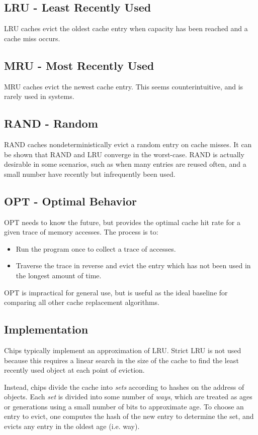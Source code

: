 \documentclass[twoside]{article}
\begin{document}
\subsection{LRU - Least Recently Used}
LRU caches evict the oldest cache entry when capacity has been reached and a
cache miss occurs.

\subsection{MRU - Most Recently Used}
MRU caches evict the newest cache entry. This seems counterintuitive, and is
rarely used in systems.

\subsection{RAND - Random}
RAND caches nondeterministically evict a random entry on cache misses. It can be
shown that RAND and LRU converge in the worst-case. RAND is actually desirable
in some scenarios, such as when many entries are reused often, and a small
number have recently but infrequently been used.

\subsection{OPT - Optimal Behavior}
OPT needs to know the future, but provides the optimal cache hit rate for a
given trace of memory accesses. The process is to:
\begin{itemize}
    \item Run the program once to collect a trace of accesses.
    \item Traverse the trace in reverse and evict the entry which has not been
        used in the longest amount of time.
\end{itemize}
OPT is impractical for general use, but is useful as the ideal baseline for
comparing all other cache replacement algorithms.

\subsection{Implementation}

Chips typically implement an approximation of LRU. Strict LRU is not used
because this requires a linear search in the size of the cache to find the least
recently used object at each point of eviction.

Instead, chips divide the cache into \emph{sets} according to hashes on the
address of objects. Each \emph{set} is divided into some number of \emph{ways},
which are treated as ages or generations using a small number of bits to
approximate age. To choose an entry to evict, one computes the hash of the new
entry to determine the set, and evicts any entry in the oldest age (i.e. way).
\end{document}

